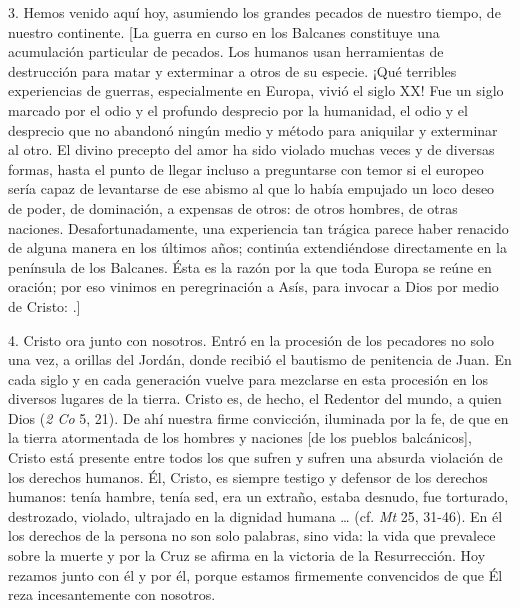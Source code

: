 \begin{body}
	3. Hemos venido aquí hoy, asumiendo los grandes pecados de nuestro tiempo, de nuestro continente. {[}La guerra en curso en los Balcanes constituye una acumulación particular de pecados. Los humanos usan herramientas de destrucción para matar y exterminar a otros de su especie. ¡Qué terribles experiencias de guerras, especialmente en Europa, vivió el siglo XX! Fue un siglo marcado por el odio y el profundo desprecio por la humanidad, el odio y el desprecio que no abandonó ningún medio y método para aniquilar y exterminar al otro. El divino precepto del amor ha sido violado muchas veces y de diversas formas, hasta el punto de llegar incluso a preguntarse con temor si el europeo sería capaz de levantarse de ese abismo al que lo había empujado un loco deseo de poder, de dominación, a expensas de otros: de otros hombres, de otras naciones. Desafortunadamente, una experiencia tan trágica parece haber renacido de alguna manera en los últimos años; continúa extendiéndose directamente en la península de los Balcanes. Ésta es la razón por la que toda Europa se reúne en oración; por eso vinimos en peregrinación a Asís, para invocar a Dios por medio de Cristo: .{]}

	4. Cristo ora junto con nosotros. Entró en la procesión de los pecadores no solo una vez, a orillas del Jordán, donde recibió el bautismo de penitencia de Juan. En cada siglo y en cada generación vuelve para mezclarse en esta procesión en los diversos lugares de la tierra. Cristo es, de hecho, el Redentor del mundo, a quien Dios  (\emph{2 Co} 5, 21). De ahí nuestra firme convicción, iluminada por la fe, de que en la tierra atormentada de los hombres y naciones {[}de los pueblos balcánicos{]}, Cristo está presente entre todos los que sufren y sufren una absurda violación de los derechos humanos. Él, Cristo, es siempre testigo y defensor de los derechos humanos: tenía hambre, tenía sed, era un extraño, estaba desnudo, fue torturado, destrozado, violado, ultrajado en la dignidad humana \ldots{} (cf. \emph{Mt} 25, 31-46). En él los derechos de la persona no son solo palabras, sino vida: la vida que prevalece sobre la muerte y por la Cruz se afirma en la victoria de la Resurrección. Hoy rezamos junto con él y por él, porque estamos firmemente convencidos de que Él reza incesantemente con nosotros.


\end{body}

